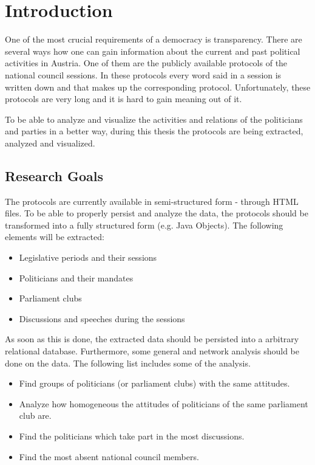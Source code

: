 \chapter{Introduction}
\label{sec:introduction}

One of the most crucial requirements of a democracy is transparency. There are several ways how one can gain information about the current and past political activities in Austria. One of them are the publicly available protocols of the national council sessions. In these protocols every word said in a session is written down and that makes up the corresponding protocol. Unfortunately, these protocols are very long and it is hard to gain meaning out of it.

To be able to analyze and visualize the activities and relations of the politicians and parties in a better way, during this thesis the protocols are being extracted, analyzed and visualized. 

\section{Research Goals}
The protocols are currently available in semi-structured form - through HTML files. To be able to properly persist and analyze the data, the protocols should be transformed into a fully structured form (e.g. Java Objects). The following elements will be extracted:
\begin{itemize}
  \item Legislative periods and their sessions
  \item Politicians and their mandates
  \item Parliament clubs
  \item Discussions and speeches during the sessions
\end{itemize}

As soon as this is done, the extracted data should be persisted into a arbitrary relational database. Furthermore, some general and network analysis should be done on the data. The following list includes some of the analysis.
\begin{itemize}
  \item Find groups of politicians (or parliament clubs) with the same attitudes.
  \item Analyze how homogeneous the attitudes of politicians of the same parliament club are.
  \item Find the politicians which take part in the most discussions.
  \item Find the most absent national council members.
\end{itemize}

